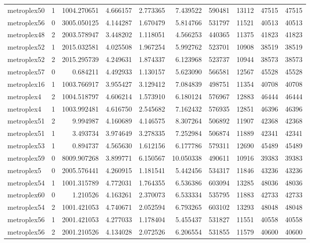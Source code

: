 \documentclass[../../../thesis.tex]{subfiles}
\begin{document}
\begin{longtable}{|l|r|r|r|r|r|r|r|r|r|}
metroplex50 & 1 & 1004.270651 & 4.666157 & 2.773365 & 7.439522 & 590481 & 13112 & 47515 & 47515 \\
metroplex56 & 0 & 3005.050125 & 4.144287 & 1.670479 & 5.814766 & 531797 & 11521 & 40513 & 40513 \\
metroplex48 & 2 & 2003.578947 & 3.448202 & 1.118051 & 4.566253 & 440365 & 11375 & 41823 & 41823 \\
metroplex52 & 1 & 2015.032581 & 4.025508 & 1.967254 & 5.992762 & 523701 & 10908 & 38519 & 38519 \\
metroplex52 & 2 & 2015.295739 & 4.249631 & 1.874337 & 6.123968 & 523737 & 10944 & 38573 & 38573 \\
metroplex57 & 0 & 0.684211 & 4.492933 & 1.130157 & 5.623090 & 566581 & 12567 & 45528 & 45528 \\
metroplex16 & 1 & 1003.766917 & 3.955427 & 3.129412 & 7.084839 & 498751 & 11354 & 40708 & 40708 \\
metroplex4 & 2 & 1004.518797 & 4.606214 & 1.573910 & 6.180124 & 576967 & 12883 & 46444 & 46444 \\
metroplex4 & 1 & 1003.992481 & 4.616750 & 2.545682 & 7.162432 & 576935 & 12851 & 46396 & 46396 \\
metroplex51 & 2 & 9.994987 & 4.160689 & 4.146575 & 8.307264 & 506892 & 11907 & 42368 & 42368 \\
metroplex51 & 1 & 3.493734 & 3.974649 & 3.278335 & 7.252984 & 506874 & 11889 & 42341 & 42341 \\
metroplex53 & 1 & 0.894737 & 4.565630 & 1.612156 & 6.177786 & 579311 & 12690 & 45489 & 45489 \\
metroplex59 & 0 & 8009.907268 & 3.899771 & 6.150567 & 10.050338 & 490611 & 10916 & 39383 & 39383 \\
metroplex5 & 0 & 2005.576441 & 4.260915 & 1.181541 & 5.442456 & 534317 & 11846 & 43236 & 43236 \\
metroplex54 & 1 & 1001.315789 & 4.772031 & 1.764355 & 6.536386 & 603094 & 13285 & 48036 & 48036 \\
metroplex60 & 0 & 1.210526 & 4.163261 & 2.370073 & 6.533334 & 535795 & 11883 & 42733 & 42733 \\
metroplex54 & 2 & 1001.421053 & 4.740671 & 2.052594 & 6.793265 & 603102 & 13293 & 48048 & 48048 \\
metroplex56 & 1 & 2001.421053 & 4.277033 & 1.178404 & 5.455437 & 531827 & 11551 & 40558 & 40558 \\
metroplex56 & 2 & 2001.210526 & 4.134028 & 2.072526 & 6.206554 & 531855 & 11579 & 40600 & 40600 \\

\end{longtable}
\end{document}
